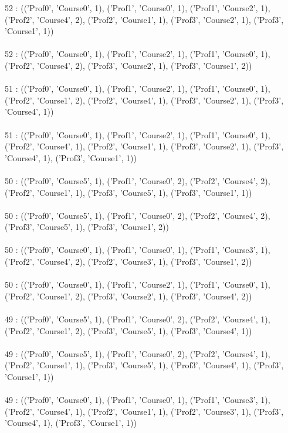 \begin{enumerate}
52 : (('Prof0', 'Course0', 1), ('Prof1', 'Course0', 1), ('Prof1', 'Course2', 1), ('Prof2', 'Course4', 2), ('Prof2', 'Course1', 1), ('Prof3', 'Course2', 1), ('Prof3', 'Course1', 1))\\ \\
52 : (('Prof0', 'Course0', 1), ('Prof1', 'Course2', 1), ('Prof1', 'Course0', 1), ('Prof2', 'Course4', 2), ('Prof3', 'Course2', 1), ('Prof3', 'Course1', 2))\\ \\
51 : (('Prof0', 'Course0', 1), ('Prof1', 'Course2', 1), ('Prof1', 'Course0', 1), ('Prof2', 'Course1', 2), ('Prof2', 'Course4', 1), ('Prof3', 'Course2', 1), ('Prof3', 'Course4', 1))\\ \\
51 : (('Prof0', 'Course0', 1), ('Prof1', 'Course2', 1), ('Prof1', 'Course0', 1), ('Prof2', 'Course4', 1), ('Prof2', 'Course1', 1), ('Prof3', 'Course2', 1), ('Prof3', 'Course4', 1), ('Prof3', 'Course1', 1))\\ \\
50 : (('Prof0', 'Course5', 1), ('Prof1', 'Course0', 2), ('Prof2', 'Course4', 2), ('Prof2', 'Course1', 1), ('Prof3', 'Course5', 1), ('Prof3', 'Course1', 1))\\ \\
50 : (('Prof0', 'Course5', 1), ('Prof1', 'Course0', 2), ('Prof2', 'Course4', 2), ('Prof3', 'Course5', 1), ('Prof3', 'Course1', 2))\\ \\
50 : (('Prof0', 'Course0', 1), ('Prof1', 'Course0', 1), ('Prof1', 'Course3', 1), ('Prof2', 'Course4', 2), ('Prof2', 'Course3', 1), ('Prof3', 'Course1', 2))\\ \\
50 : (('Prof0', 'Course0', 1), ('Prof1', 'Course2', 1), ('Prof1', 'Course0', 1), ('Prof2', 'Course1', 2), ('Prof3', 'Course2', 1), ('Prof3', 'Course4', 2))\\ \\
49 : (('Prof0', 'Course5', 1), ('Prof1', 'Course0', 2), ('Prof2', 'Course4', 1), ('Prof2', 'Course1', 2), ('Prof3', 'Course5', 1), ('Prof3', 'Course4', 1))\\ \\
49 : (('Prof0', 'Course5', 1), ('Prof1', 'Course0', 2), ('Prof2', 'Course4', 1), ('Prof2', 'Course1', 1), ('Prof3', 'Course5', 1), ('Prof3', 'Course4', 1), ('Prof3', 'Course1', 1))\\ \\
49 : (('Prof0', 'Course0', 1), ('Prof1', 'Course0', 1), ('Prof1', 'Course3', 1), ('Prof2', 'Course4', 1), ('Prof2', 'Course1', 1), ('Prof2', 'Course3', 1), ('Prof3', 'Course4', 1), ('Prof3', 'Course1', 1))\\ \\

\end{enumerate}
